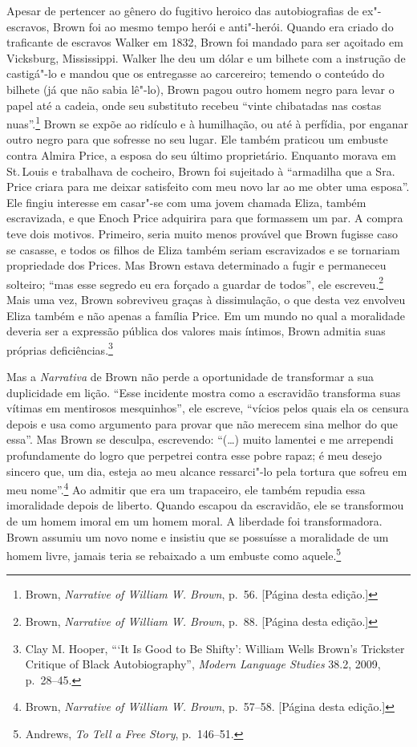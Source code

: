 Apesar de pertencer ao gênero do fugitivo heroico das autobiografias de
ex"-escravos, Brown foi ao mesmo tempo herói e anti"-herói. Quando era
criado do traficante de escravos Walker em 1832, Brown foi mandado para
ser açoitado em Vicksburg, Mississippi. Walker lhe deu um dólar e um
bilhete com a instrução de castigá"-lo e mandou que os entregasse ao
carcereiro; temendo o conteúdo do bilhete (já que não sabia lê"-lo),
Brown pagou outro homem negro para levar o papel até a cadeia, onde seu
substituto recebeu ``vinte chibatadas nas costas
nuas''.\footnote{Brown, \emph{Narrative of William W. Brown}, p.~56.
  {[}Página \pageref{ref2} desta edição.{]}} Brown se expõe ao ridículo e à
humilhação, ou até à perfídia, por enganar outro negro para que sofresse
no seu lugar. Ele também praticou um embuste contra Almira Price, a
esposa do seu último proprietário. Enquanto morava em St.\,Louis e
trabalhava de cocheiro, Brown foi sujeitado à ``armadilha que a Sra.\,Price criara para me deixar satisfeito com meu novo lar ao me obter uma
esposa''. Ele fingiu interesse em casar"-se com uma jovem chamada Eliza,
também escravizada, e que Enoch Price adquirira para que formassem um
par. A compra teve dois motivos. Primeiro, seria muito menos provável
que Brown fugisse caso se casasse, e todos os filhos de Eliza também
seriam escravizados e se tornariam propriedade dos Prices. Mas Brown
estava determinado a fugir e permaneceu solteiro; ``mas esse segredo eu
era forçado a guardar de todos'', ele escreveu.\footnote{Brown,
  \emph{Narrative of William W. Brown}, p.~88. {[}Página \pageref{ref3} desta
  edição.{]}} Mais uma vez, Brown sobreviveu graças à dissimulação, o
que desta vez envolveu Eliza também e não apenas a família Price. Em um
mundo no qual a moralidade deveria ser a expressão pública dos valores
mais íntimos, Brown admitia suas próprias deficiências.\footnote{Clay M.
  Hooper, ```It Is Good to Be Shifty': William Wells Brown's Trickster
  Critique of Black Autobiography'', \emph{Modern Language Studies} 38.2,
  2009, p.~28--45.}

Mas a \emph{Narrativa} de Brown não perde a oportunidade de transformar
a sua duplicidade em lição. ``Esse incidente mostra como a
escravidão transforma suas vítimas em mentirosos mesquinhos'', ele
escreve, ``vícios pelos quais ela os censura depois e usa como argumento
para provar que não merecem sina melhor do que essa''. Mas Brown se
desculpa, escrevendo: ``(\ldots{}) muito lamentei e me arrependi
profundamente do logro que perpetrei contra esse pobre rapaz; é meu
desejo sincero que, um dia, esteja ao meu alcance ressarci"-lo pela
tortura que sofreu em meu nome''.\footnote{Brown, \emph{Narrative of
  William W. Brown}, p.~57--58. {[}Página \pageref{ref4} desta edição.{]}} Ao admitir
que era um trapaceiro, ele também repudia essa imoralidade depois de
liberto. Quando escapou da escravidão, ele se transformou de um homem
imoral em um homem moral. A liberdade foi transformadora. Brown assumiu
um novo nome e insistiu que se possuísse a moralidade de um homem livre,
jamais teria se rebaixado a um embuste como aquele.\footnote{Andrews,
  \emph{To Tell a Free Story}, p.~146--51.}

